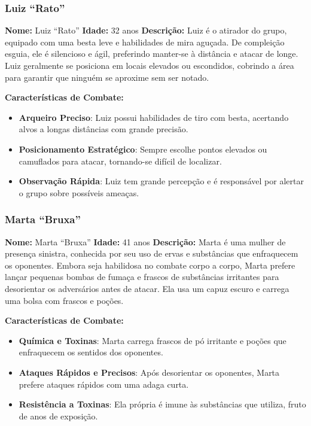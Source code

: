 \begin{personagem}
\subsubsection{Luiz ``Rato''}

\textbf{Nome:} Luiz ``Rato''  
\textbf{Idade:} 32 anos  
\textbf{Descrição:}  
Luiz é o atirador do grupo, equipado com uma besta leve e habilidades de mira aguçada. De compleição esguia, ele é silencioso e ágil, preferindo manter-se à distância e atacar de longe. Luiz geralmente se posiciona em locais elevados ou escondidos, cobrindo a área para garantir que ninguém se aproxime sem ser notado.

\textbf{Características de Combate:}
\begin{itemize}
    \item \textbf{Arqueiro Preciso}: Luiz possui habilidades de tiro com besta, acertando alvos a longas distâncias com grande precisão.
    \item \textbf{Posicionamento Estratégico}: Sempre escolhe pontos elevados ou camuflados para atacar, tornando-se difícil de localizar.
    \item \textbf{Observação Rápida}: Luiz tem grande percepção e é responsável por alertar o grupo sobre possíveis ameaças.
\end{itemize}
\end{personagem}
\begin{personagem}
\subsubsection{Marta ``Bruxa''}

\textbf{Nome:} Marta ``Bruxa''  
\textbf{Idade:} 41 anos  
\textbf{Descrição:}  
Marta é uma mulher de presença sinistra, conhecida por seu uso de ervas e substâncias que enfraquecem os oponentes. Embora seja habilidosa no combate corpo a corpo, Marta prefere lançar pequenas bombas de fumaça e frascos de substâncias irritantes para desorientar os adversários antes de atacar. Ela usa um capuz escuro e carrega uma bolsa com frascos e poções.

\textbf{Características de Combate:}
\begin{itemize}
    \item \textbf{Química e Toxinas}: Marta carrega frascos de pó irritante e poções que enfraquecem os sentidos dos oponentes.
    \item \textbf{Ataques Rápidos e Precisos}: Após desorientar os oponentes, Marta prefere ataques rápidos com uma adaga curta.
    \item \textbf{Resistência a Toxinas}: Ela própria é imune às substâncias que utiliza, fruto de anos de exposição.
\end{itemize}
\end{personagem}
